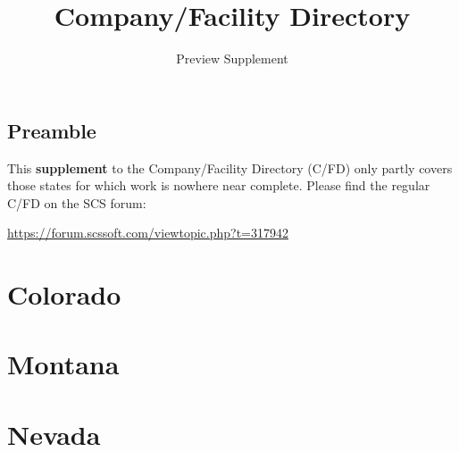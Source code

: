 
\subject{City location descriptions for ATS}
\title{Company\!/Facility Directory}
\subtitle{Preview Supplement}  %


\usepackage{scrlayer-scrpage}  %



\maketitle

\section*{Preamble}

{
\justifying

This \textbf{supplement} to the Company/Facility Directory (C/FD) only partly covers those states for which work is nowhere near complete.
Please find the regular C/FD on the SCS forum:

\centering \vspace{1ex}
\url{https://forum.scssoft.com/viewtopic.php?t=317942} \par
}

\maketoc


%

{%

\chapter{Colorado}
}


\chapter{Montana}


\chapter{Nevada}


